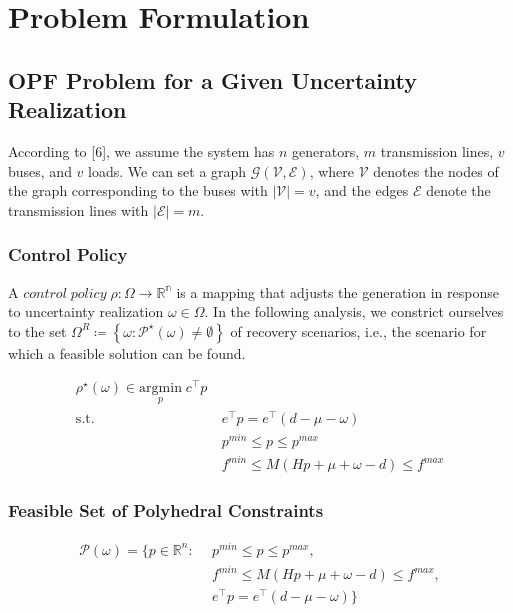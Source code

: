 \documentclass[11pt]{article}
\begin{document}
\section{Problem Formulation}\label{sec:problem}
\subsection{OPF Problem for a Given Uncertainty Realization}
According to [6], we assume the system has $n$ generators, $m$ transmission lines, $v$ buses, and $v$ loads. We can set a graph $\mathcal{G}( \mathcal{V}, \mathcal{E})$, where $\mathcal{V}$ denotes the nodes of the graph corresponding to the buses with $\left| \mathcal{V} \right| = v$, and the edges $\mathcal{E}$ denote the transmission lines with $\left| \mathcal{E} \right| = m$.

\subsubsection{Control Policy}
A $control \; policy \; \rho : \Omega\rightarrow \mathbb{R^{n}}$ is a mapping that adjusts the generation in response to uncertainty realization $\omega \in \Omega$. In the following analysis, we constrict ourselves to the set $\Omega^{R}\coloneqq\left \{ \omega:\mathcal{P}^{\star} \left ( \omega \right )\neq \emptyset \right \}$ of recovery scenarios, i.e., the scenario for which a feasible solution can be found.

\begin{align}\label{eq:opf}
\rho^{\star}\left (  \omega \right )\in \underset{p}{\mathrm{argmin}} \; c^{\top }p \\
\textrm{s.t.} ~ &~ e^{\top }p=e^{\top }\left ( d-\mu -\omega  \right ) \\
~&~ p^{min}\leq p\leq p^{max} \\
~&~ f^{min}\leq M\left ( Hp+\mu +\omega -d \right )  \leq f^{max}
\end{align}

\subsubsection{Feasible Set of Polyhedral Constraints}
\begin{align}\label{eq:opf_poly}
\mathcal{P}\left ( \omega \right ) =  \{ p\in\mathbb{R}^{n}:
~ &~p^{min}\leq p\leq p^{max}, \nonumber \\
~ &~ f^{min}\leq M\left ( Hp+\mu +\omega -d \right )  \leq f^{max}, \nonumber \\
~ &~ e^{\top }p=e^{\top }\left ( d-\mu -\omega  \right )  \}
\end{align}
\end{document}
